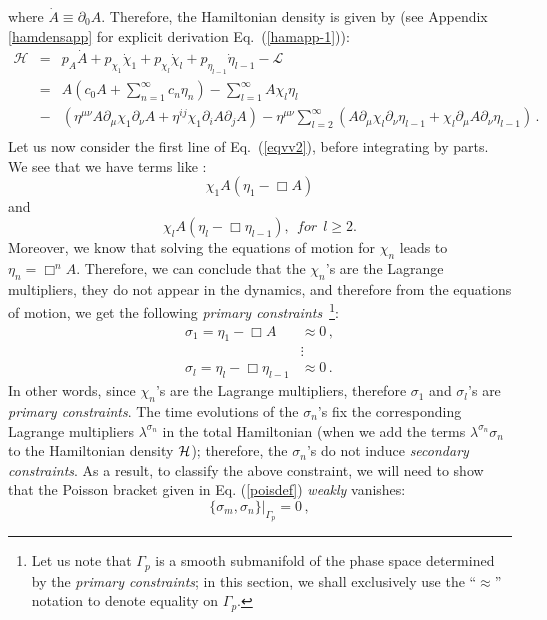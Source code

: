 \documentclass[a4paper,12pt]{article}
\newcommand{\la}{\lambda}
\newcommand{\sa}{\sigma}
\newcommand{\Ga}{\Gamma}
\newcommand{\cH}{{\cal H}}
\newcommand{\+}{^{\dagger}}
\newcommand{\2}{\frac{1}{2}}
\newcommand{\3}{\frac{1}{3}}
\newcommand{\4}{\frac{1}{4}}
\newcommand{\6}{\frac{1}{6}}
\newcommand{\8}{\frac{1}{8}}
\begin{document}
where $\dot{A}\equiv\partial_0 A$.  Therefore, the Hamiltonian density is given by (see Appendix \ref{hamdensapp} for explicit derivation
Eq.~(\ref{hamapp-1})):
%
\begin{eqnarray}\label{hamdens}
\mathcal{H}&=&p_A\dot{A}+p_{\chi_1}\dot{\chi}_1+p_{\chi_l}\dot{\chi}_l+p_{\eta_{l-1}}\dot{\eta}_{l-1}-\mathcal{L}\nonumber\\&=&
A(c_{0}A+\sum^{\infty}_{n=1}c_n\eta_{n})-\sum ^{\infty}_{l=1}A\chi_l
\eta_l\nonumber\\
&-&(\eta^{\mu\nu}A\partial_{\mu}\chi_1  \partial_\nu A+\eta^{ij}\chi_1
\partial_i A
\partial_j A)
-\eta^{\mu\nu}\sum^{\infty}_{l=2}(A\partial_\mu\chi_{l}  \partial_\nu\eta_{l-1}
+\chi_l
\partial_\mu A
\partial_\nu \eta_{l-1})\,.\nonumber\\
\end{eqnarray}
Let us now consider the first line of Eq.~(\ref{eqvv2}), before integrating by parts. We see that we
have  terms like :  $$\chi_{1}A(\eta_{1}-\Box A)$$ and $$\chi_lA(\eta_l-\Box
\eta_{l-1}),~~for~~l \geq 2.$$ Moreover,
we know that solving the equations of motion for $\chi_n$ leads to $\eta_n=\Box^{n}
A$. Therefore, we can conclude that the $\chi_{n}$'s are the Lagrange multipliers, they do not appear in the dynamics, 
and therefore from the equations of motion, we get the following {\it primary constraints}~\footnote{ Let us note that $\Ga_p$ is a smooth submanifold of the phase space determined by the {\it primary constraints}; in this section, we shall exclusively use the ``$\approx$'' notation to denote equality on $\Ga_p$.}:
\begin{align}
\sa_{1} =\eta_{1}-\Box A & \approx 0 \,, \nonumber \\
&\vdots \\ \nonumber
\sa_{l}=\eta_{l}-\Box \eta_{l-1} & \approx 0 \,.
\end{align} 
In other words, since $\chi_{n}$'s are the Lagrange multipliers, therefore $\sa_{1}$ and $\sa_{l}$'s are {\it primary constraints}.
The time evolutions of the $\sa_n$'s fix the corresponding Lagrange multipliers $\la^{\sa_n}$ in the total Hamiltonian (when we add the terms $\la^{\sa_n}\sa_{n}$
to the Hamiltonian density $\cH$); therefore, the $\sa_n$'s do not induce \textit{secondary constraints}.
As a result, to classify the above constraint, we will need to show that the Poisson bracket given in Eq. (\ref{poisdef}) {\it weakly} vanishes:
\begin{equation}
\{\sigma _{m},\sigma _{n}\}|_{\Ga_p}= 0\,,
\end{equation}
\end{document}

